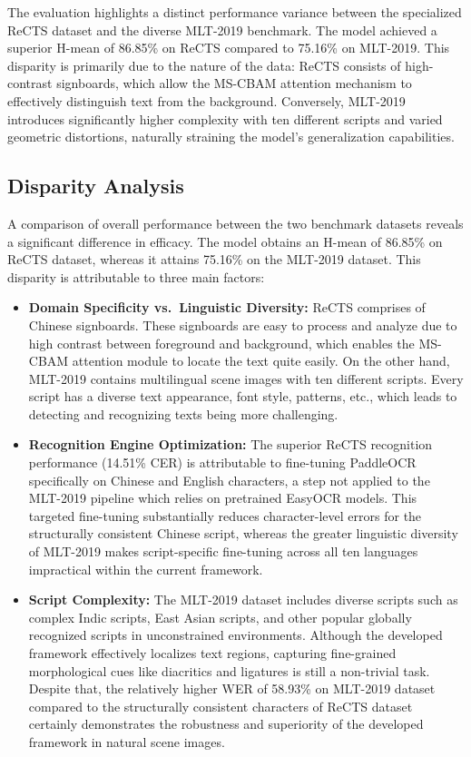 \documentclass{ieeeaccess}
\begin{document}
{The evaluation highlights a distinct performance variance between the
specialized ReCTS dataset and the diverse MLT-2019 benchmark. The model
achieved a superior H-mean of 86.85\% on ReCTS compared to 75.16\% on
MLT-2019. This disparity is primarily due to the nature of the data: ReCTS
consists of high-contrast signboards, which allow the MS-CBAM attention
mechanism to effectively distinguish text from the background. Conversely,
MLT-2019 introduces significantly higher complexity with ten different scripts
and varied geometric distortions, naturally straining the model's generalization
capabilities.

\subsection{Disparity Analysis}

A comparison of overall performance between the two benchmark datasets reveals a significant difference in efficacy. The model obtains an H-mean of 86.85\% on ReCTS dataset, whereas it attains 75.16\% on the MLT-2019 dataset. This disparity is attributable to three main factors:

\begin{itemize}
  \item \textbf{Domain Specificity vs.\ Linguistic Diversity:} ReCTS comprises of Chinese signboards. These signboards are easy to process and analyze due to high contrast between foreground and background, which enables the MS-CBAM attention module to locate the text quite easily. On the other hand, MLT-2019 contains multilingual scene images with ten different scripts. Every script has a diverse text appearance, font style, patterns, etc., which leads to detecting and recognizing texts being more challenging.

  \item \textbf{Recognition Engine Optimization:} The superior ReCTS recognition performance (14.51\% CER) is attributable to fine-tuning PaddleOCR specifically on Chinese and English characters, a step not applied to the MLT-2019 pipeline which relies on pretrained EasyOCR models. This targeted fine-tuning substantially reduces character-level errors for the structurally consistent Chinese script, whereas the greater linguistic diversity of MLT-2019 makes script-specific fine-tuning across all ten languages impractical within the current framework.

  \item \textbf{Script Complexity:} The MLT-2019 dataset includes diverse scripts such as complex Indic scripts, East Asian scripts, and other popular globally recognized scripts in unconstrained environments. Although the developed framework effectively localizes text regions, capturing fine-grained morphological cues like diacritics and ligatures is still a non-trivial task. Despite that, the relatively higher WER of 58.93\% on MLT-2019 dataset compared to the structurally consistent characters of ReCTS dataset certainly demonstrates the robustness and superiority of the developed framework in natural scene images.
\end{itemize}

}
\end{document}
